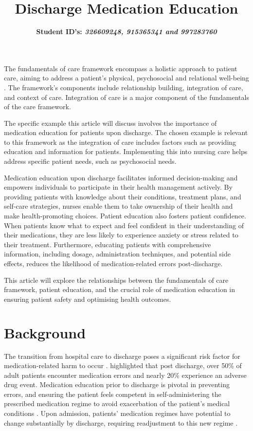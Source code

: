 \documentclass[british,12pt,a4paper]{article}
\title{{\fontsize{14}{15} \textbf{Discharge Medication Education}}\vspace{-1em}}
\author{{\fontsize{14}{15} \textbf{Student ID's: \textit{326609248, 915365341 and 997283760 }}}}
\date{}
\begin{document}
	\maketitle
	\thispagestyle{fancy}
	The fundamentals of care framework encompass a holistic approach to patient care, aiming to address a patient's physical, psychosocial and relational well-being \parencite{Dempsey2013}.  The framework's components include relationship building, integration of care, and context of care. Integration of care is a major component of the fundamentals of the care framework.

	The specific example this article will discuss involves the importance of medication education for patients upon discharge. The chosen example is relevant to this framework as the integration of care includes factors such as providing education and information for patients. Implementing this into nursing care helps address specific patient needs, such as psychosocial needs. 

	Medication education upon discharge facilitates informed decision-making and empowers individuals to participate in their health management actively. By providing patients with knowledge about their conditions, treatment plans, and self-care strategies, nurses enable them to take ownership of their health and make health-promoting choices. Patient education also fosters patient confidence. When patients know what to expect and feel confident in their understanding of their medications, they are less likely to experience anxiety or stress related to their treatment. Furthermore, educating patients with comprehensive information, including dosage, administration techniques, and potential side effects, reduces the likelihood of medication-related errors post-discharge. 

	This article will explore the relationships between the fundamentals of care framework, patient education, and the crucial role of medication education in ensuring patient safety and optimising health outcomes.

	\section{Background}
	The transition from hospital care to discharge poses a significant risk factor for medication-related harm to occur \parencite{Flatman2021}. \textcite{Alqenae2020} highlighted that post discharge, over 50\% of adult patients encounter medication errors and nearly 20\% experience an adverse drug event. Medication education prior to discharge is pivotal in preventing errors, and ensuring the patient feels competent in self-administering the prescribed medication regime to avoid exacerbation of the patient's medical conditions \parencite{Hajialibeigloo2021}. Upon admission, patients' medication regimes have potential to change substantially by discharge, requiring readjustment to this new regime \parencite{Weir2020}. 
\end{document}
